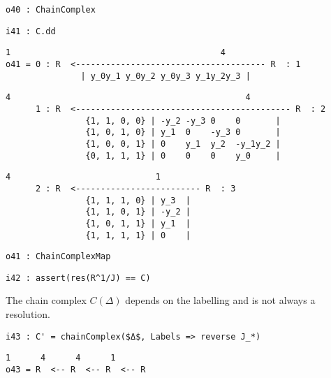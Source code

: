 \documentclass[12pt,leqno]{amsart}
\theoremstyle{definition}
\begin{document}
\begin{lstlisting}[xleftmargin=10pt, aboveskip=1.5pt, belowskip=1.5pt]
o40 : ChainComplex
\end{lstlisting}
\begin{lstlisting}[xleftmargin=10pt, aboveskip=1.5pt, belowskip=1.5pt]
i41 : C.dd
\end{lstlisting}
\begin{lstlisting}[xleftmargin=10pt, lineskip=-10pt, aboveskip=1.5pt, belowskip=3.0pt]
           1                                          4
o41 = 0 : R  <-------------------------------------- R  : 1
               | y_0y_1 y_0y_2 y_0y_3 y_1y_2y_3 |
\end{lstlisting}
\begin{lstlisting}[xleftmargin=10pt, lineskip=-10pt, aboveskip=1.5pt, belowskip=3.0pt]
           4                                               4
      1 : R  <------------------------------------------- R  : 2
                {1, 1, 0, 0} | -y_2 -y_3 0    0       |
                {1, 0, 1, 0} | y_1  0    -y_3 0       |
                {1, 0, 0, 1} | 0    y_1  y_2  -y_1y_2 |
                {0, 1, 1, 1} | 0    0    0    y_0     |
\end{lstlisting}
\begin{lstlisting}[xleftmargin=10pt, lineskip=-10pt, aboveskip=1.5pt, belowskip=1.5pt]
           4                             1
      2 : R  <------------------------- R  : 3
                {1, 1, 1, 0} | y_3  |
                {1, 1, 0, 1} | -y_2 |
                {1, 0, 1, 1} | y_1  |
                {1, 1, 1, 1} | 0    |
\end{lstlisting}
\begin{lstlisting}[xleftmargin=10pt, aboveskip=1.5pt, belowskip=1.5pt]
o41 : ChainComplexMap
\end{lstlisting}
\begin{lstlisting}[xleftmargin=10pt, aboveskip=1.5pt, belowskip=3.0pt]
i42 : assert(res(R^1/J) == C)
\end{lstlisting}
The chain complex $C(\Delta)$ 
depends on the labelling and is not always a resolution.
\begin{lstlisting}[xleftmargin=10pt, aboveskip=3.0pt, belowskip=1.5pt]
i43 : C' = chainComplex($Δ$, Labels => reverse J_*)
\end{lstlisting}
\begin{lstlisting}[xleftmargin=10pt, lineskip=-10pt, aboveskip=1.5pt, belowskip=1.5pt]
       1      4      4      1
o43 = R  <-- R  <-- R  <-- R
\end{lstlisting}
\end{document}
